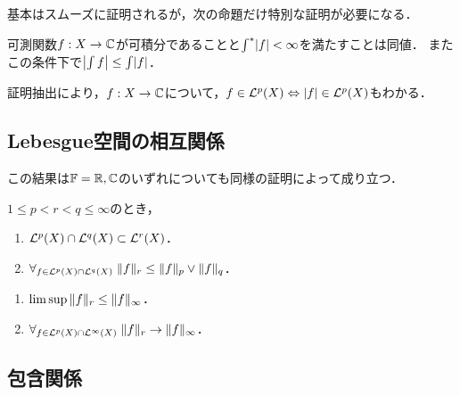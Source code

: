 \documentclass[uplatex,dvipdfmx]{jsreport}
\begin{document}
\begin{tcolorbox}[colframe=ForestGreen, colback=ForestGreen!10!white,breakable,colbacktitle=ForestGreen!40!white,coltitle=black,fonttitle=\bfseries\sffamily,
title=]
    基本はスムーズに証明されるが，次の命題だけ特別な証明が必要になる．
\end{tcolorbox}

\begin{proposition}
    可測関数$f:X\to\mathbb{C}$が可積分であることと$\int^*\lvert f\rvert<\infty$を満たすことは同値．
    またこの条件下で$\left|\int f\right|\le\int\lvert f\rvert$．
\end{proposition}
\begin{remarks}
    証明抽出により，$f:X\to\mathbb{C}$について，$f\in\mathcal{L}^p(X)\Leftrightarrow\lvert f\rvert\in\mathcal{L}^p(X)$もわかる．
\end{remarks}

\subsection{Lebesgue空間の相互関係}

\begin{tcolorbox}[colframe=ForestGreen, colback=ForestGreen!10!white,breakable,colbacktitle=ForestGreen!40!white,coltitle=black,fonttitle=\bfseries\sffamily,
title=]
    この結果は$\mathbb{F}=\mathbb{R},\mathbb{C}$のいずれについても同様の証明によって成り立つ．
\end{tcolorbox}

\begin{proposition}
    $1\le p<r<q\le\infty$のとき，
    \begin{enumerate}
        \item $\mathcal{L}^p(X)\cap\mathcal{L}^q(X)\subset\mathcal{L}^r(X)$．
        \item $\forall_{f\in\mathcal{L}^p(X)\cap\mathcal{L}^q(X)}\;\|f\|_r\le\|f\|_p\lor\|f\|_q$．
    \end{enumerate}
\end{proposition}

\begin{corollary}\mbox{}
    \begin{enumerate}
        \item $\limsup\|f\|_r\le\|f\|_\infty$．
        \item $\forall_{f\in\mathcal{L}^p(X)\cap\mathcal{L}^\infty(X)}\;\|f\|_r\to\|f\|_\infty$．
    \end{enumerate}
\end{corollary}

\subsection{包含関係}
\end{document}
